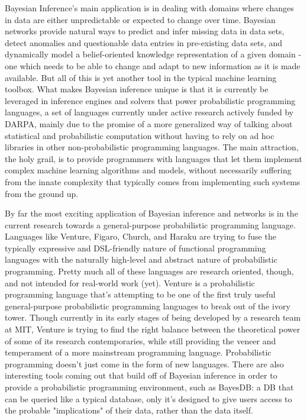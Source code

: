 \documentclass[a4paper,12pt]{article}
\begin{document}
Bayesian Inference's main application is in dealing with domains where changes in data are either unpredictable or expected to change over time. Bayesian networks provide natural ways to predict and infer missing data in data sets, detect anomalies and questionable data entries in pre-existing data sets, and dynamically model a belief-oriented knowledge representation of a given domain - one which needs to be able to change and adapt to new information as it is made available. But all of this is yet another tool in the typical machine learning toolbox. What makes Bayesian inference unique is that it is currently be leveraged in inference engines and solvers that power probabilistic programming languages, a set of languages currently under active research actively funded by DARPA, mainly due to the promise of a more generalized way of talking about statistical and probabilistic computation without having to rely on ad hoc libraries in other non-probabilistic programming languages. The main attraction, the holy grail, is to provide programmers with languages that let them implement complex machine learning algorithms and models, without necessarily suffering from the innate complexity that typically comes from implementing such systems from the ground up.

By far the most exciting application of Bayesian inference and networks is in the current research towards a general-purpose probabilistic programming language. 
Languages like Venture\cite{Mansinghka2014}, Figaro, Church\cite{Church2012}, and Haraku are trying to fuse the typically expressive and DSL-friendly nature of functional programming languages with the naturally high-level and abstract nature of probabilistic programming. Pretty much all of these languages are research oriented, though, and not intended for real-world work (yet).
Venture is a probabilistic programming language that's attempting to be one of the first truly useful general-purpose probabilistic programming languages to break out of the ivory tower. Though currently in its early stages of being developed by a research team at MIT, Venture is trying to find the right balance between the theoretical power of some of its research contemporaries, while still providing the veneer and temperament of a more mainstream programming language. Probabilistic programming doesn't just come in the form of new languages. There are also interesting tools coming out that build off of Bayesian inference in order to provide a probabilistic programming environment, such as BayesDB: a DB that can be queried like a typical database, only it's designed to give users access to the probable "implications" of their data, rather than the data itself.\cite{Mansinghka2015}
\end{document}

